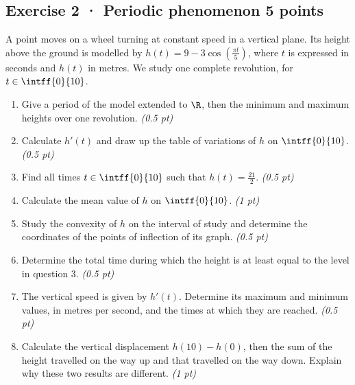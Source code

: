 \subsection*{Exercise 2 · Periodic phenomenon \hfill 5 points}A point moves on a wheel turning at constant speed in a vertical plane. Its height above the ground is modelled by $h(t)=9-3\cos\left(\frac{\pi t}{5}\right)$, where $t$ is expressed in seconds and $h(t)$ in metres. We study one complete revolution, for $t\in\intff{0}{10}$.

\begin{enumerate}

\item Give a period of the model extended to $\R$, then the minimum and maximum heights over one revolution. \hfill\textit{(0.5 pt)}

\item Calculate $h'(t)$ and draw up the table of variations of $h$ on $\intff{0}{10}$. \hfill\textit{(0.5 pt)}

\item Find all times $t\in\intff{0}{10}$ such that $h(t)=\frac{21}{2}$. \hfill\textit{(0.5 pt)}

\item Calculate the mean value of $h$ on $\intff{0}{10}$. \hfill\textit{(1 pt)}

\item Study the convexity of $h$ on the interval of study and determine the coordinates of the points of inflection of its graph. \hfill\textit{(0.5 pt)}

\item Determine the total time during which the height is at least equal to the level in question 3. \hfill\textit{(0.5 pt)}

\item The vertical speed is given by $h'(t)$. Determine its maximum and minimum values, in metres per second, and the times at which they are reached. \hfill\textit{(0.5 pt)}

\item Calculate the vertical displacement $h(10)-h(0)$, then the sum of the height travelled on the way up and that travelled on the way down. Explain why these two results are different. \hfill\textit{(1 pt)}

\end{enumerate}

\mxnewpage{}

